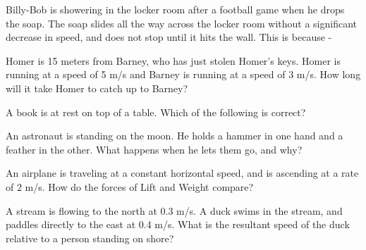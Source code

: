 \documentclass[10pt]{examdesign}
\begin{document}
\begin{multiplechoice} [title={Multiple Choice},
	rearrange=no]
\begin{question}
	Billy-Bob is showering in the locker room after a football game when he drops the soap.  The soap slides all the way across the locker room without a significant decrease in speed, and does not stop until it hits the wall.  This is because - 
\end{question}

\begin{question}
	Homer is 15 meters from Barney, who has just stolen Homer's keys.  Homer is running at a speed of 5 m/s and Barney is running at a speed of 3 m/s.  How long will it take Homer to catch up to Barney?
\end{question}


\begin{question}
A book is at rest on top of a table. Which of the following is correct?
\end{question}

\begin{question}
	An astronaut is standing on the moon.  He holds a hammer in one hand and a feather in the other.  What happens when he lets them go, and why?
\end{question}


\begin{question}
	An airplane is traveling at a constant horizontal speed, and is ascending at a rate of 2 m/s. How do the forces of Lift and Weight compare?	
\end{question}

\begin{question}A stream is flowing to the north at 0.3 m/s.  A duck swims in the stream, and paddles directly to the east at 0.4 m/s. What is the resultant speed of the duck relative to a person standing on shore?  
\end{question}


\end{multiplechoice}
\end{document}
